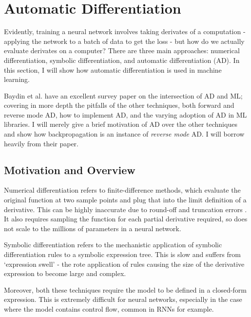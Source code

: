 \section{Automatic Differentiation}
Evidently, training a neural network involves taking derivates of a computation - applying the network to a batch of data to get the loss -
but how do we actually evaluate derivates on a computer?
There are three main approaches: numerical differentiation, symbolic differentiation, and automatic differentiation (AD).
In this section, I will show how automatic differentiation is used in machine learning.

Baydin et al. \cite{Baydin2015} have an excellent survey paper on the intersection of AD and ML;
covering in more depth the pitfalls of the other techniques, both forward and reverse mode AD, how to implement AD, and the varying adoption of AD in ML libraries.
I will merely give a brief motivation of AD over the other techniques and show how backpropagation is an instance of \textit{reverse mode} AD.
I will borrow heavily from their paper.

\subsection{Motivation and Overview}
Numerical differentiation refers to finite-difference methods, which evaluate the original function at two sample points and plug that into the limit definition of a derivative.
This can be highly inaccurate due to round-off and truncation errors \cite{Jerrell1997}.
It also requires sampling the function for each partial derivative required, so does not scale to the millions of parameters in a neural network.

Symbolic differentiation refers to the mechanistic application of symbolic differentiation rules to a symbolic expression tree.
This is slow and suffers from `expression swell' \cite{Juedes1991} - the rote application of rules causing the size of the derivative expression to become large and complex.

Moreover, both these techniques require the model to be defined in a closed-form expression.
This is extremely difficult for neural networks, especially in the case where the model contains control flow, common in RNNs for example.

